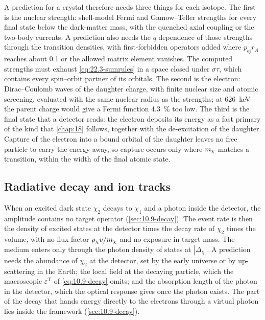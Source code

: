 A prediction for a crystal therefore needs three things for each isotope. The first is the nuclear strength: shell-model Fermi and Gamow--Teller strengths for every final state below the dark-matter mass, with the quenched axial coupling or the two-body currents. A prediction also needs the $q$ dependence of those strengths through the transition densities, with first-forbidden operators added where $p_{\mathrm{ej}}r_A$ reaches about 0.1 or the allowed matrix element vanishes. The computed strengths must exhaust \cref{eq:22.3-sumrules} in a space closed under $\sigma\tau$, which contains every spin--orbit partner of its orbitals. The second is the electron: Dirac--Coulomb waves of the daughter charge, with finite nuclear size and atomic screening, evaluated with the same nuclear radius as the strengths; at \SI{626}{keV} the parent charge would give a Fermi function \SI{4.3}{\percent} too low. The third is the final state that a detector reads: the electron deposits its energy as a fast primary of the kind that \cref{chap:18} follows, together with the de-excitation of the daughter. Capture of the electron into a bound orbital of the daughter leaves no free particle to carry the energy away, so capture occurs only where $m_{\chi}$ matches a transition, within the width of the final atomic state.

\subsection{Radiative decay and ion tracks}\label{sec:22.3-tracks}

When an excited dark state $\chi_2$ decays to $\chi_1$ and a photon inside the detector, the amplitude contains no target operator (\cref{sec:10.9-decay}). The event rate is then the density of excited states at the detector times the decay rate of $\chi_2$ times the volume, with no flux factor $\rho_\chi v/m_{\chi}$ and no exposure in target mass. The medium enters only through the photon density of states at $|\Delta_\chi|$. A prediction needs the abundance of $\chi_2$ at the detector, set by the early universe or by up-scattering in the Earth; the local field at the decaying particle, which the macroscopic $\varepsilon^{\mathrm{T}}$ of \cref{eq:10.9-decay} omits; and the absorption length of the photon in the detector, which the optical response gives once the photon exists. The part of the decay that hands energy directly to the electrons through a virtual photon lies inside the framework (\cref{sec:10.9-decay}).


